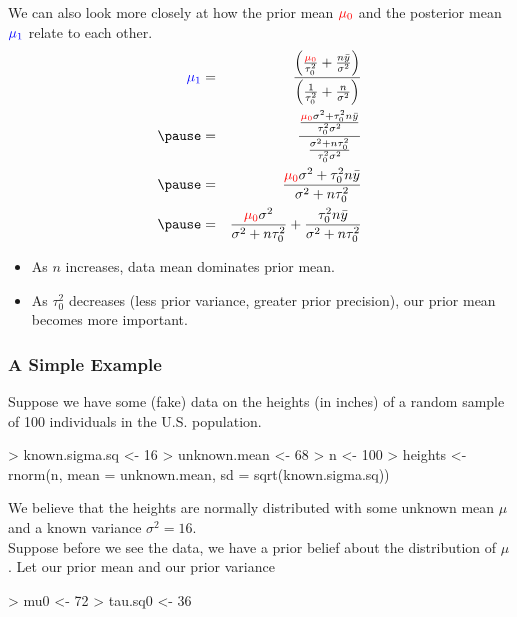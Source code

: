 \documentclass[handout]{beamer}
\begin{document}
\begin{frame}
We can also look more closely at how the prior mean $\textcolor{red}{\mu_0}$ and
the posterior mean $\textcolor{blue}{\mu_1}$ relate to each other.
\pause
\footnotesize
\begin{eqnarray*}
 \blue{\mu_1} &=& \frac{\left( \frac{\red{\mu_0}}{\tau_0^2} + \frac{n
\bar{y}}{\sigma^2}\right)}{\left( \frac{1}{\tau_0^2} +
\frac{n}{\sigma^2}\right)}\\
\pause
&=& \frac{\frac{\red{\mu_0} \sigma^2 + \tau_0^2 n \bar{y}}{\tau_0^2
\sigma^2}}{\frac{\sigma^2 + n\tau_0^2}{\tau_0^2 \sigma^2}} \\
\pause
&=& \frac{\red{\mu_0} \sigma^2 + \tau^2_0 n \bar{y}}{\sigma^2 + n\tau_0^2}\\
\pause
&=& \frac{\red{\mu_0} \sigma^2}{\sigma^2 + n\tau_0^2} + \frac{\tau^2_0 n \bar{y}}{\sigma^2 + n\tau_0^2}
\end{eqnarray*}
\normalsize
\pause
\begin{itemize}
\item As $n$ increases, data mean dominates prior mean.
\pause
\item As $\tau_0^2$ decreases (less prior variance, greater prior
precision), our prior mean becomes more important.
\end{itemize}
\end{frame}


\begin{frame}[fragile]
\frametitle{A Simple Example}
\pause
Suppose we have some (fake) data on the heights (in inches) of a
random sample of 100 individuals in the U.S. population.
\pause
\medskip
\tiny
\begin{Schunk}
\begin{Sinput}
> known.sigma.sq <- 16
> unknown.mean <- 68
> n <- 100
> heights <- rnorm(n, mean = unknown.mean, sd = sqrt(known.sigma.sq))
\end{Sinput}
\end{Schunk}
\normalsize
\pause
\bigskip
 We believe that the heights are normally distributed with some
unknown mean $\mu$ and a known variance $\sigma^2 = 16$.\\
\bigskip
\pause
Suppose before we see the data, we have a prior belief about the
distribution of $\mu$.  Let our prior mean  and our prior
variance 
\medskip
\pause
\tiny
\begin{Schunk}
\begin{Sinput}
> mu0 <- 72
> tau.sq0 <- 36
\end{Sinput}
\end{Schunk}
\end{frame}
\end{document}
